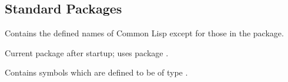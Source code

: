 \subsection{Standard Packages}
\begin{LIST}{1cm}

  {
  Contains the defined names of Common Lisp except for those in the
   package.
  }

  {
    Current package after startup; uses package . 
  }

  {
    Contains symbols which are defined to be of type .
  }

\end{LIST}
